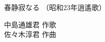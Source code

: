\documentclass[10pt,b5j]{tarticle} %
\begin{document}
\begin{minipage}[c]{0.7\hsize} %
    \begin{center}
        {\LARGE
            春静寂なる %
        }
        {\small 
            （昭和23年逍遙歌） %
        }
    \end{center}
\end{minipage}
\begin{minipage}[c]{0.3\hsize} %
    \begin{flushright} %
        中島通雄君 作歌\\佐々木淳君 作曲 %
    \end{flushright}
\end{minipage}
\end{document}
